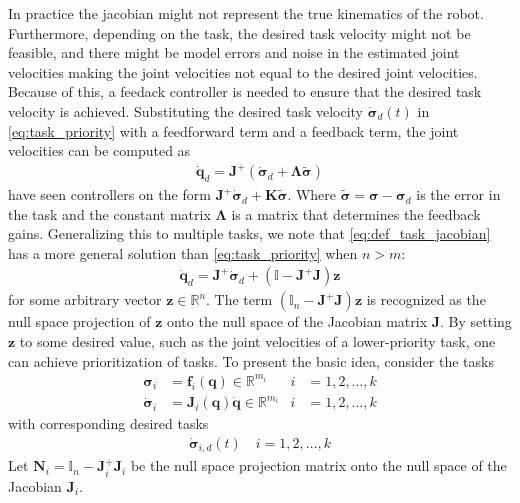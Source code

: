 In practice the jacobian might not represent the true kinematics of the robot.
Furthermore, depending on the task, the desired task velocity might not be feasible,
and there might be model errors and noise in the estimated joint velocities making
the joint velocities not equal to the desired joint velocities. Because of this,
a feedack controller is needed to ensure that the desired task velocity is
achieved. Substituting the desired task velocity $\dot{\bm{\sigma}}_d(t)$ in 
\autoref{eq:task_priority} with
a feedforward term and a feedback term, the joint velocities can be computed as
\begin{align}
    \dot{\bm{q}}_d = \bm{J}^{+} \left(\dot{\bm{\sigma}}_d + \bm{\Lambda}\tilde{\bm{\sigma}}\right)
\end{align}
{
    \color{red} have seen controllers on the form $\bm{J}^{+} \dot{\bm{\sigma}}_d + \bm{K}\tilde{\bm{\sigma}}$.
}
Where $\tilde{\bm{\sigma}} = \bm{\sigma} - \bm{\sigma}_d$ is the error in the
task and the constant matrix $\bm{\Lambda}$ is a matrix that determines the
feedback gains.
Generalizing this to multiple tasks, we note that \autoref{eq:def_task_jacobian}
has a more general solution than \autoref{eq:task_priority} when $n > m$:
\begin{align}
    \dot{\bm{q}}_d = \bm{J}^{+} \dot{\bm{\sigma}}_d + (\mathbb{I} - \bm{J}^{+} \bm{J}) \bm{z}
\end{align}
for some arbitrary vector $\bm{z} \in \mathbb{R}^n$. The term
$(\mathbb{I}_n - \bm{J}^{+} \bm{J}) \bm{z}$ is recognized as the null space projection
of $\bm{z}$ onto the null space of the Jacobian matrix $\bm{J}$. By setting
$\bm{z}$ to some desired value, such as the joint velocities of a lower-priority task,
one can achieve prioritization of tasks. To present the basic idea, consider the
tasks
\begin{subequations}
\begin{align}
    \bm{\sigma}_i &= \bm{f}_i(\bm{q}) \in \mathbb{R}^{m_i} &i &= 1, 2, \ldots, k \\
    \dot{\bm{\sigma}}_i &= \bm{J}_i(\bm{q}) \dot{\bm{q}} \in \mathbb{R}^{m_i} &i &= 1, 2, \ldots, k
\end{align}
\end{subequations}
with corresponding desired tasks
\begin{align}
    \dot{\bm{\sigma}}_{i,d}(t) \quad i = 1, 2, \ldots, k
\end{align}
Let $\bm{N}_i = \mathbb{I}_n - \bm{J}_i^{+} \bm{J}_i$ be the null space projection
matrix onto the null space of the Jacobian $\bm{J}_i$.
